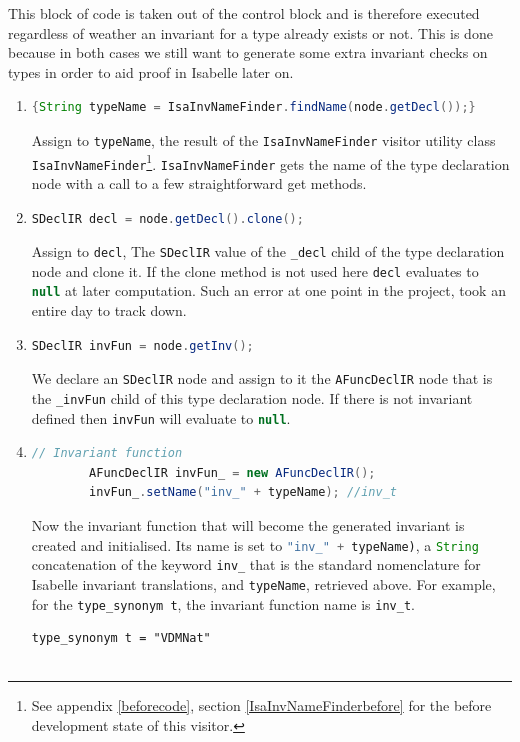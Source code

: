	This block of code is taken out of the control block and is therefore executed regardless of weather an invariant for a type already exists or not. This is done because in both cases we still want to generate some extra invariant checks on types in order to aid proof in Isabelle later on.
	\begin{enumerate}
		\item \begin{lstlisting}[language=Java] 
		{String typeName = IsaInvNameFinder.findName(node.getDecl());}
		\end{lstlisting}
	  	Assign to \lstinline[language=Java]{typeName}, the result of the \lstinline[language=Java]{IsaInvNameFinder} visitor utility class \lstinline[language=Java]{IsaInvNameFinder}\footnote{See appendix \ref{beforecode}, section \ref{IsaInvNameFinderbefore} for the before development state of this visitor.}. \lstinline[language=Java]{IsaInvNameFinder} gets the name of the type declaration node with a call to a few straightforward get methods.
		\item \begin{lstlisting}[language=Java] 
		SDeclIR decl = node.getDecl().clone();
		\end{lstlisting} 
		Assign to \lstinline[language=Java]{decl}, The \lstinline[language=Java]{SDeclIR} value of the \lstinline[language=Java]{_decl} child of the type declaration node and clone it. If the clone method is not used here \lstinline[language=Java]{decl} evaluates to \lstinline[language=Java]{null} at later computation. Such an error at one point in the project, took an entire day to track down.
		\item \begin{lstlisting}[language=Java] 
		SDeclIR invFun = node.getInv();
	    \end{lstlisting}
	    We declare an \lstinline[language=Java]{SDeclIR} node and assign to it the \lstinline[language=Java]{AFuncDeclIR} node that is the \lstinline[language=Java]{_invFun} child of this type declaration node. If there is not invariant defined then \lstinline[language=Java]{invFun} will evaluate to \lstinline[language=Java]{null}.
	    \item \begin{lstlisting}[language=Java] 
		// Invariant function
	    AFuncDeclIR invFun_ = new AFuncDeclIR();
	    invFun_.setName("inv_" + typeName); //inv_t
	    \end{lstlisting}
	    Now the invariant function that will become the generated invariant is created and initialised. Its name is set to \lstinline[language=Java]{"inv_" + typeName)}, a \lstinline[language=Java]{String} concatenation of the keyword \lstinline[language=Java]{inv_} that is the standard nomenclature for Isabelle invariant translations, and \lstinline[language=Java]{typeName}, retrieved above. For example, for the \lstinline[language=Isabelle, mathescape]{type_synonym t}, the invariant function name is \lstinline[language=Isabelle, mathescape]{inv_t}.
	    \begin{lstlisting}[language = Isabelle]
	    type_synonym t = "VDMNat"


\end{lstlisting}
\end{enumerate}
